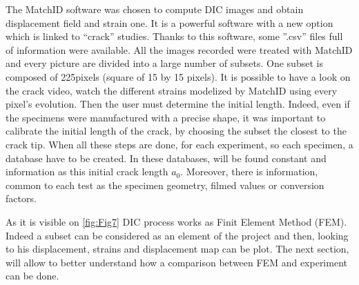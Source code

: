 The MatchID software was chosen to compute DIC images and obtain displacement field and strain one. It is a powerful software with a new option which is linked to “crack” studies.
Thanks to this software, some ”.csv” files full of information were available. All the images recorded were treated with MatchID and every picture are divided into a large number of subsets. One subset is composed of 225pixels (square of 15 by 15 pixels). It is possible to have a look on the crack video, watch the different strains modelized by MatchID using every pixel’s evolution. Then the user must determine the initial length. Indeed, even if the specimens were manufactured with a precise shape, it was important to calibrate the initial length of the crack, by choosing the subset the closest to the crack tip.
When all these steps are done, for each experiment, so each specimen, a database have to be created. In these databases, will be found constant and information as this initial crack length $a_{0}$. Moreover, there is information, common to each test as the specimen geometry, filmed values or conversion factors.

As it is visible on \ref{fig:Fig7} DIC process works as Finit Element Method (FEM). Indeed a subset can be considered as an element of the project and then, looking to his displacement, strains and displacement map can be plot. The next section, will allow to better understand how a comparison between FEM and experiment can be done.


